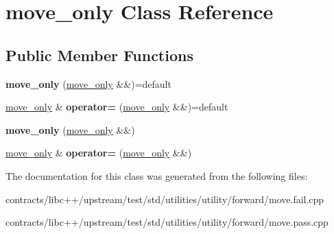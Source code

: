 \hypertarget{structmove__only}{}\section{move\+\_\+only Class Reference}
\label{structmove__only}
\subsection*{Public Member Functions}
\begin{DoxyCompactItemize}
\item 
\mbox{\label{structmove__only_ade7aebf9cdff6474cb2b0b989c599319}} 
{\bfseries move\+\_\+only} (\mbox{\hyperlink{structmove__only}{move\+\_\+only}} \&\&)=default
\item 
\mbox{\label{structmove__only_a4b6223fad48d6aaaf1b5072ca4182085}} 
\mbox{\hyperlink{structmove__only}{move\+\_\+only}} \& {\bfseries operator=} (\mbox{\hyperlink{structmove__only}{move\+\_\+only}} \&\&)=default
\item 
\mbox{\label{structmove__only_a1478bdaabe26049d770018b85e40515f}} 
{\bfseries move\+\_\+only} (\mbox{\hyperlink{structmove__only}{move\+\_\+only}} \&\&)
\item 
\mbox{\label{structmove__only_a608b97299667444a0131cd0761ee55c5}} 
\mbox{\hyperlink{structmove__only}{move\+\_\+only}} \& {\bfseries operator=} (\mbox{\hyperlink{structmove__only}{move\+\_\+only}} \&\&)
\end{DoxyCompactItemize}


The documentation for this class was generated from the following files\+:\begin{DoxyCompactItemize}
\item 
contracts/libc++/upstream/test/std/utilities/utility/forward/move.\+fail.\+cpp\item 
contracts/libc++/upstream/test/std/utilities/utility/forward/move.\+pass.\+cpp\end{DoxyCompactItemize}
